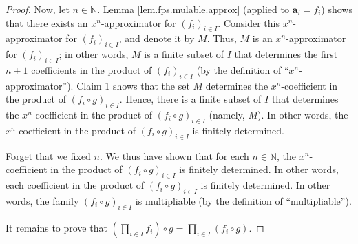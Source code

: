 \begin{fineprint}
\begin{proof}
Now, let $n\in\mathbb{N}$. Lemma \ref{lem.fps.mulable.approx} (applied to
$\mathbf{a}_{i}=f_{i}$) shows that there exists an $x^{n}$-approximator for
$\left(  f_{i}\right)  _{i\in I}$. Consider this $x^{n}$-approximator for
$\left(  f_{i}\right)  _{i\in I}$, and denote it by $M$. Thus, $M$ is an
$x^{n}$-approximator for $\left(  f_{i}\right)  _{i\in I}$; in other words,
$M$ is a finite subset of $I$ that determines the first $n+1$ coefficients in
the product of $\left(  f_{i}\right)  _{i\in I}$ (by the definition of
\textquotedblleft$x^{n}$-approximator\textquotedblright). Claim 1 shows that
the set $M$ determines the $x^{n}$-coefficient in the product of $\left(
f_{i}\circ g\right)  _{i\in I}$. Hence, there is a finite subset of $I$ that
determines the $x^{n}$-coefficient in the product of $\left(  f_{i}\circ
g\right)  _{i\in I}$ (namely, $M$). In other words, the $x^{n}$-coefficient in
the product of $\left(  f_{i}\circ g\right)  _{i\in I}$ is finitely determined.

Forget that we fixed $n$. We thus have shown that for each $n\in\mathbb{N}$,
the $x^{n}$-coefficient in the product of $\left(  f_{i}\circ g\right)  _{i\in
I}$ is finitely determined. In other words, each coefficient in the product of
$\left(  f_{i}\circ g\right)  _{i\in I}$ is finitely determined. In other
words, the family $\left(  f_{i}\circ g\right)  _{i\in I}$ is multipliable (by
the definition of \textquotedblleft multipliable\textquotedblright). \medskip

It remains to prove that $\left(  \prod_{i\in I}f_{i}\right)  \circ
g=\prod_{i\in I}\left(  f_{i}\circ g\right)  $.


\end{proof}
\end{fineprint}
